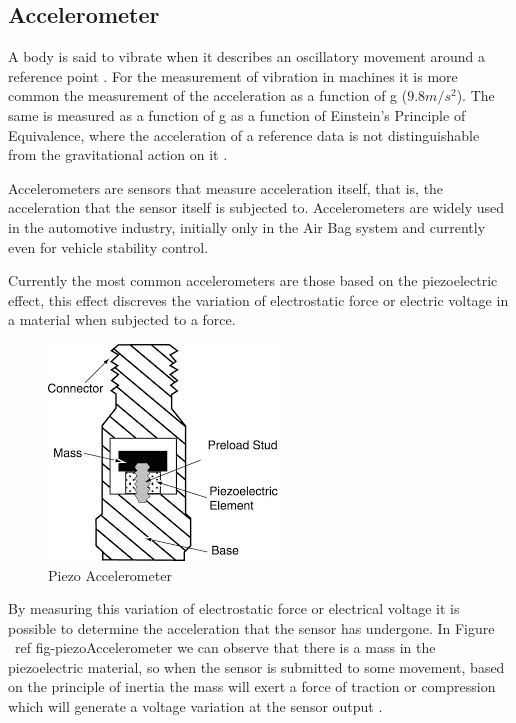 \subsection{Accelerometer}

A body is said to vibrate when it describes an oscillatory movement around a reference point \cite{joaocan2000}. For the measurement of vibration in machines it is more common the measurement of the acceleration as a function of g ($9.8m/s^2$). The same is measured as a function of g as a function of Einstein's Principle of Equivalence, where the acceleration of a reference data is not distinguishable from the gravitational action on it \cite{nordtvedt1968equivalence}.
		\par
		Accelerometers are sensors that measure acceleration itself, that is, the acceleration that the sensor itself is subjected to. Accelerometers are widely used in the automotive industry, initially only in the Air Bag system and currently even for vehicle stability control.
		\par
		Currently the most common accelerometers are those based on the piezoelectric effect, this effect discreves the variation of electrostatic force or electric voltage in a material when subjected to a force.

		\begin{figure}[htbp]
			\centering
				\includegraphics[scale=0.75]{figuras/fig-piezo-acel.jpg}
			\caption{Piezo Accelerometer \cite{piezo-accel}}
			\label{fig-piezoAccelerometer}
		\end{figure}

		By measuring this variation of electrostatic force or electrical voltage it is possible to determine the acceleration that the sensor has undergone. In Figure \ ref {fig-piezoAccelerometer} we can observe that there is a mass in the piezoelectric material, so when the sensor is submitted to some movement, based on the principle of inertia the mass will exert a force of traction or compression which will generate a voltage variation at the sensor output \cite{patrick2006}.
